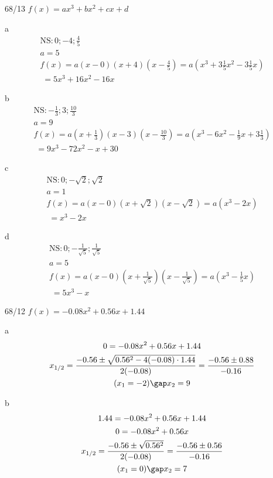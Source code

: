 \begin{exercise}{68/13}
  $f(x) = ax^3 + bx^2 + cx + d$
  \item [a]
  \begin{gather*}
    \text{NS} \colon 0; -4; \frac{4}{5} \\
    a = 5 \\
    f(x) = a(x - 0)(x + 4)(x - \frac{4}{5}) = a(x^3 + 3\frac{1}{5}x^2 - 3\frac{1}{5}x) \\
    \;= 5x^3 + 16x^2 - 16x
  \end{gather*}
  \item [b]
  \begin{gather*}
    \text{NS} \colon -\frac{1}{3}; 3; \frac{10}{3} \\
    a = 9 \\
    f(x) = a(x + \frac{1}{3})(x - 3)(x - \frac{10}{3}) = a(x^3 - 6x^2 - \frac{1}{9}x + 3\frac{1}{3}) \\
    \;= 9x^3 - 72x^2 - x + 30
  \end{gather*}
  \item [c]
  \begin{gather*}
    \text{NS} \colon 0; -\sqrt{2}; \sqrt{2} \\
    a = 1 \\
    f(x) = a(x - 0)(x + \sqrt{2})(x - \sqrt{2}) = a(x^3 - 2x) \\
    \;= x^3 - 2x
  \end{gather*}
  \item [d]
  \begin{gather*}
    \text{NS} \colon 0; -\frac{1}{\sqrt{5}}; \frac{1}{\sqrt{5}} \\
    a = 5 \\
    f(x) = a(x - 0)(x + \frac{1}{\sqrt{5}})(x - \frac{1}{\sqrt{5}}) = a(x^3 - \frac{1}{5}x) \\
    \;= 5x^3 - x
  \end{gather*}
\end{exercise}
\begin{exercise}{68/12}
  $f(x) = -0.08x^2 + 0.56x + 1.44$
  \item [a]
  \begin{gather*}
    0 = -0.08x^2 + 0.56x + 1.44 \\
    x_{1/2} = \frac{-0.56 \pm \sqrt{0.56^2 - 4(-0.08) \cdot 1.44}}{2(-0.08)} = \frac{-0.56 \pm 0.88}{-0.16} \\
    (x_1 = -2) \gap x_2 = 9
  \end{gather*}
  \item [b]
  \begin{gather*}
    1.44 = -0.08x^2 + 0.56x + 1.44 \\
    0 = -0.08x^2 + 0.56x \\
    x_{1/2} = \frac{-0.56 \pm \sqrt{0.56^2}}{2(-0.08)} = \frac{-0.56 \pm 0.56}{-0.16} \\
    (x_1 = 0) \gap x_2 = 7
  \end{gather*}
\end{exercise}

